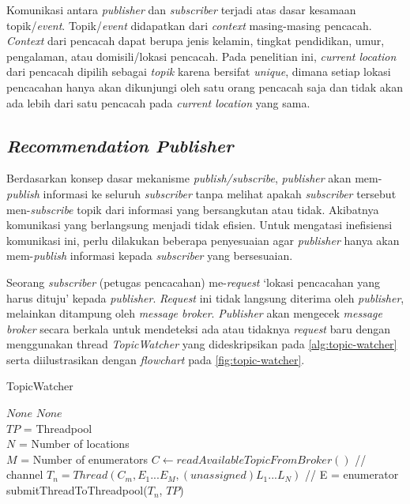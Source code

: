 Komunikasi antara \textit{publisher} dan \textit{subscriber} terjadi atas dasar kesamaan topik/\textit{event}. Topik/\textit{event} didapatkan dari \textit{context} masing-masing pencacah. \textit{Context} dari pencacah dapat berupa jenis kelamin, tingkat pendidikan, umur, pengalaman, atau domisili/lokasi pencacah. Pada penelitian ini, \textit{current location} dari pencacah dipilih sebagai \textit{topik} karena bersifat \textit{unique}, dimana setiap lokasi pencacahan hanya akan dikunjungi oleh satu orang pencacah saja dan tidak akan ada lebih dari satu pencacah pada \textit{current location} yang sama.


\subsection{\textit{Recommendation Publisher}}
\label{ssec:publisher}
Berdasarkan konsep dasar mekanisme \textit{publish/subscribe}, \textit{publisher} akan mem-\textit{publish} informasi ke seluruh \textit{subscriber} tanpa melihat apakah \textit{subscriber} tersebut men-\textit{subscribe} topik dari informasi yang bersangkutan atau tidak. Akibatnya komunikasi yang berlangsung menjadi tidak efisien. Untuk mengatasi inefisiensi komunikasi ini, perlu dilakukan beberapa penyesuaian agar \textit{publisher} hanya akan mem-\textit{publish} informasi kepada \textit{subscriber} yang bersesuaian. 

Seorang \textit{subscriber} (petugas pencacahan) me-\textit{request} `lokasi pencacahan yang harus dituju' kepada \textit{publisher}. \textit{Request} ini tidak langsung diterima oleh \textit{publisher}, melainkan ditampung oleh \textit{message broker}. \textit{Publisher} akan mengecek \textit{message broker} secara berkala untuk mendeteksi ada atau tidaknya \textit{request} baru dengan menggunakan thread \textit{TopicWatcher} yang dideskripsikan pada \autoref{alg:topic-watcher} serta diilustrasikan dengan \textit{flowchart} pada \autoref{fig:topic-watcher}. 


\begin{algorithm}[!]
	\caption{TopicWatcher}
	\label{alg:topic-watcher}
	\begin{algorithmic}[1]
		\renewcommand{\algorithmicrequire}{\textbf{Input:}}
		\renewcommand{\algorithmicensure}{\textbf{Output:}}
		\REQUIRE $None$
		\ENSURE  $None$
		\\ $TP$ = Threadpool
		\\ $N$ = Number of locations
		\\ $M$ = Number of enumerators
			\STATE $C \leftarrow readAvailableTopicFromBroker()$	// channel
						\STATE $T_n = Thread(C_m, E_1...E_M, (unassigned) L_1...L_N)$	// E = enumerator
						\STATE submitThreadToThreadpool($T_n$, $TP$)
					\ENDIF
				\ENDFOR
			\ENDFOR
		\ENDWHILE
	\end{algorithmic}
\end{algorithm}



